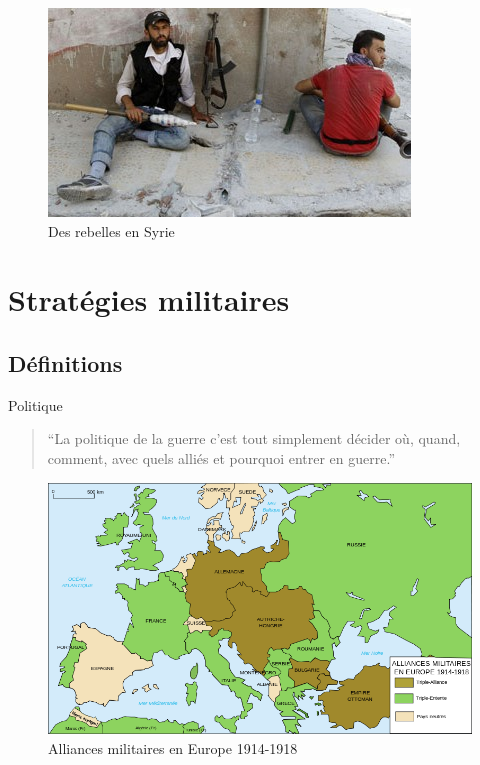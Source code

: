 \documentclass{article}
\begin{document}
\begin{figure}[H]
	\begin{centering}
	\includegraphics[]{../ressources/rebel_syrie}
	\caption{Des rebelles en Syrie \cite{rebel_syrie}}
	\end{centering}
\end{figure}


\section{Stratégies militaires}

\subsection{Définitions}
Politique \cite{politique_jomini}
\begin{quote}“La politique de la guerre c’est tout simplement décider où, quand, comment, avec quels alliés et pourquoi entrer en guerre.”\end{quote}
\begin{figure}[H]
	\begin{centering}
	\includegraphics[width=0.94\linewidth]{../ressources/alliances_ww1}
	\caption{Alliances militaires en Europe 1914-1918 \cite{ww1}}
	\end{centering}
\end{figure}
\end{document}
